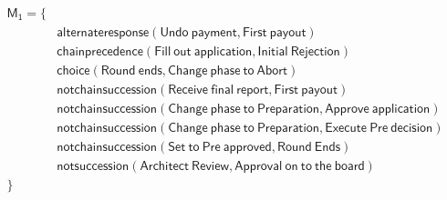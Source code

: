 \begin{align*}
\mathsf{M_1} = \{ & \\
& \mathsf{ alternateresponse(Undo\ payment, First\ payout)} \\
& \mathsf{ chainprecedence(Fill\ out\ application, Initial\ Rejection)} \\
& \mathsf{ choice(Round\ ends, Change\ phase\ to\ Abort)} \\
& \mathsf{ notchainsuccession(Receive\ final\ report, First\ payout)} \\
& \mathsf{ notchainsuccession(Change\ phase\ to\ Preparation, Approve\ application)} \\
& \mathsf{ notchainsuccession(Change\ phase\ to\ Preparation, Execute\ Pre\ decision)} \\
& \mathsf{ notchainsuccession(Set\ to\ Pre\ approved, Round\ Ends)} \\
& \mathsf{ notsuccession(Architect\ Review, Approval\ on\ to\ the\ board)} \\
\} & %
\end{align*}


